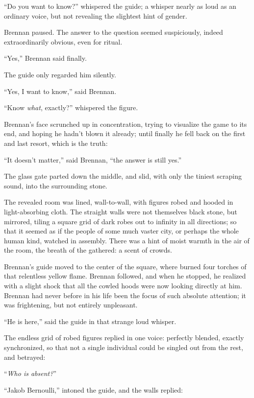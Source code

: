 {
 ``Do you want to know?''
whispered the guide; a whisper nearly as loud as an ordinary voice, but
not revealing the slightest hint of gender.}

{
 Brennan paused. The answer to the question seemed suspiciously,
indeed extraordinarily obvious, even for ritual.}

{
 ``Yes,'' Brennan said finally.}

{
 The guide only regarded him silently.}

{
 ``Yes, I want to know,'' said
Brennan.}

{
 ``Know \textit{what},
exactly?'' whispered the figure.}

{
 Brennan's face scrunched up in concentration,
trying to visualize the game to its end, and hoping he
hadn't blown it already; until finally he fell back on
the first and last resort, which is the truth:}

{
 ``It doesn't
matter,'' said Brennan, ``the answer
is still yes.''}

{
 The glass gate parted down the middle, and slid, with only the
tiniest scraping sound, into the surrounding stone.}

{
 The revealed room was lined, wall-to-wall, with figures robed and
hooded in light-absorbing cloth. The straight walls were not themselves
black stone, but mirrored, tiling a square grid of dark robes out to
infinity in all directions; so that it seemed as if the people of some
much vaster city, or perhaps the whole human kind, watched in assembly.
There was a hint of moist warmth in the air of the room, the breath of
the gathered: a scent of crowds.}

{
 Brennan's guide moved to the center of the square,
where burned four torches of that relentless yellow flame. Brennan
followed, and when he stopped, he realized with a slight shock that all
the cowled hoods were now looking directly at him. Brennan had never
before in his life been the focus of such absolute attention; it was
frightening, but not entirely unpleasant.}

{
 ``He is here,'' said the guide
in that strange loud whisper.}

{
 The endless grid of robed figures replied in one voice: perfectly
blended, exactly synchronized, so that not a single individual could be
singled out from the rest, and betrayed:}

{
 ``\textit{Who is absent?}''}

{
 ``Jakob Bernoulli,'' intoned
the guide, and the walls replied:}

